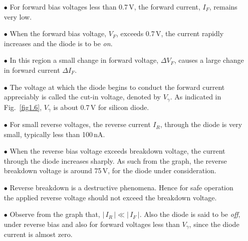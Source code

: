 \begin{itemize}
\itemsep=1pt
\item[$\bullet$] For forward bias voltages less than 0.7\,V, the forward current, $I_{F}$, remains very low.

\item[$\bullet$] When the forward bias voltage, $V_{F}$, exceeds 0.7\,V, the current rapidly increases and the diode is to be {\em on}.

\item[$\bullet$] In this region a small change in forward voltage, $\Delta V_{F}$, causes a large change in forward current $\Delta I_{F}$.

\item[$\bullet$] The voltage at which the diode begins to conduct the forward current appreciably is called the cut-in voltage, denoted by $V_{\gamma}$. As indicated in Fig.~\ref{fig1.6}, $V_{\gamma}$ is about 0.7\,V for silicon diode.\\[-18pt]
\end{itemize}

\begin{itemize}
\itemsep=1pt
\item[$\bullet$] For small reverse voltages, the reverse current $I_{R}$, through the diode is very small, typically less than 100\,nA.

\item[$\bullet$] When the reverse bias voltage exceeds breakdown voltage, the current through the diode increases sharply. As such from the graph, the reverse breakdown voltage is around 75\,V, for the diode under consideration. 

\item[$\bullet$] Reverse breakdown is a destructive phenomena. Hence for safe operation the applied reverse voltage should not exceed the breakdown voltage.

\item[$\bullet$] Observe from the graph that, $|\,I_{R}\,|\ll |\,I_{F}\,|$. Also the diode is said to be {\em off}, under reverse bias and also for forward voltages less than $V_{\gamma}$, since the diode current is almost zero.
\end{itemize}


